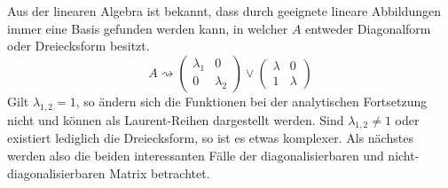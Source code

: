 Aus der linearen Algebra ist bekannt, dass durch geeignete lineare Abbildungen immer eine Basis gefunden werden kann, in welcher $A$ entweder Diagonalform oder Dreiecksform besitzt.
$$A\rightsquigarrow\begin{pmatrix}\lambda_1 & 0 \\ 0 & \lambda_2\end{pmatrix}\vee\begin{pmatrix}\lambda & 0 \\ 1 & \lambda\end{pmatrix}$$
Gilt $\lambda_{1,2}=1$, so ändern sich die Funktionen bei der analytischen Fortsetzung nicht und können als Laurent-Reihen dargestellt werden. Sind $\lambda_{1,2}\ne1$ oder existiert lediglich die Dreiecksform, so ist es etwas komplexer. Als nächstes werden also die beiden interessanten Fälle der diagonalisierbaren und nicht-diagonalisierbaren Matrix betrachtet.




